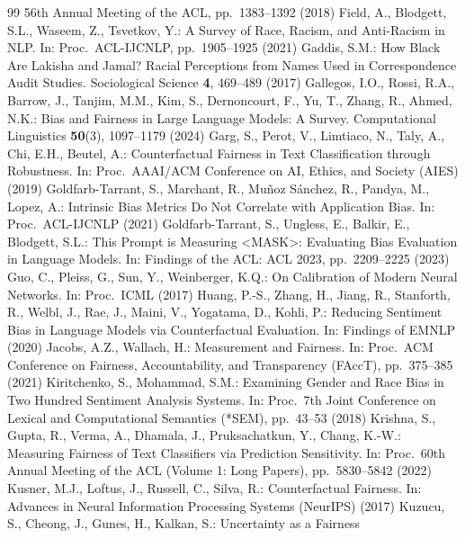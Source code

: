 \documentclass[runningheads]{llncs}
\begin{document}
\begin{thebibliography}{99}
56th Annual Meeting of the ACL, pp.\ 1383--1392 (2018)
 Field, A., Blodgett, S.L., Waseem, Z., Tsvetkov, Y.: A
Survey of Race, Racism, and Anti-Racism in NLP. In: Proc.\ ACL-IJCNLP,
pp.\ 1905--1925 (2021)
 Gaddis, S.M.: How Black Are Lakisha and Jamal? Racial
Perceptions from Names Used in Correspondence Audit Studies. Sociological
Science \textbf{4}, 469--489 (2017)
 Gallegos, I.O., Rossi, R.A., Barrow, J., Tanjim, M.M., Kim, S., Dernoncourt,
F., Yu, T., Zhang, R., Ahmed, N.K.: Bias and Fairness in Large Language
Models: A Survey. Computational Linguistics \textbf{50}(3), 1097--1179 (2024)
 Garg, S., Perot, V., Limtiaco, N., Taly, A., Chi, E.H.,
Beutel, A.: Counterfactual Fairness in Text Classification through Robustness.
In: Proc.\ AAAI/ACM Conference on AI, Ethics, and Society (AIES) (2019)
 Goldfarb-Tarrant, S., Marchant, R., Mu\~noz S\'anchez,
R., Pandya, M., Lopez, A.: Intrinsic Bias Metrics Do Not Correlate with
Application Bias. In: Proc.\ ACL-IJCNLP (2021)
 Goldfarb-Tarrant, S., Ungless, E., Balkir, E., Blodgett, S.L.: This Prompt
is Measuring \textless MASK\textgreater: Evaluating Bias Evaluation in Language Models. In:
Findings of the ACL: ACL 2023, pp.\ 2209--2225 (2023)
 Guo, C., Pleiss, G., Sun, Y., Weinberger, K.Q.: On
Calibration of Modern Neural Networks. In: Proc.\ ICML (2017)
 Huang, P.-S., Zhang, H., Jiang, R., Stanforth, R., Welbl,
J., Rae, J., Maini, V., Yogatama, D., Kohli, P.: Reducing Sentiment Bias in
Language Models via Counterfactual Evaluation. In: Findings of EMNLP (2020)
 Jacobs, A.Z., Wallach, H.: Measurement and Fairness. In:
Proc.\ ACM Conference on Fairness, Accountability, and Transparency (FAccT),
pp.\ 375--385 (2021)
 Kiritchenko, S., Mohammad, S.M.: Examining Gender and
Race Bias in Two Hundred Sentiment Analysis Systems. In: Proc.\ 7th Joint
Conference on Lexical and Computational Semantics (*SEM), pp.\ 43--53 (2018)
 Krishna, S., Gupta, R., Verma, A., Dhamala, J., Pruksachatkun, Y.,
Chang, K.-W.: Measuring Fairness of Text Classifiers via Prediction Sensitivity.
In: Proc.\ 60th Annual Meeting of the ACL (Volume 1: Long Papers),
pp.\ 5830--5842 (2022)
 Kusner, M.J., Loftus, J., Russell, C., Silva, R.:
Counterfactual Fairness. In: Advances in Neural Information Processing Systems
(NeurIPS) (2017)
 Kuzucu, S., Cheong, J., Gunes, H., Kalkan, S.: Uncertainty as a Fairness

\end{thebibliography}
\end{document}
